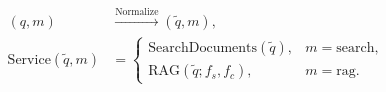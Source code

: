 \documentclass[border=4pt]{standalone}
\begin{document}
$\displaystyle
\begin{aligned}
(q,m)&\xrightarrow{\mathrm{Normalize}}(\tilde q,m),\\
\mathrm{Service}(\tilde q,m)&=
\begin{cases}
\mathrm{SearchDocuments}(\tilde q),&m=\mathrm{search},\\
\mathrm{RAG}(\tilde q;f_s,f_c),&m=\mathrm{rag}.
\end{cases}
\end{aligned}
$
\end{document}
